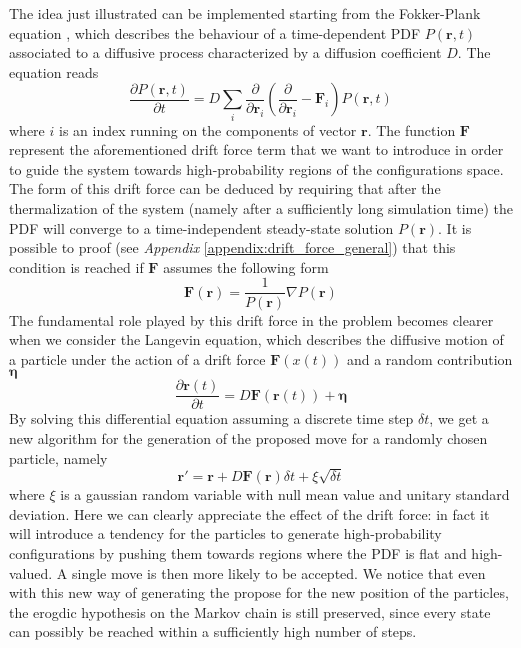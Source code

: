 The idea just illustrated can be implemented starting from the Fokker-Plank equation \cite{lectures2015}, which describes the behaviour of a time-dependent PDF $P(\bm{r}, t)$ associated to a diffusive process characterized by a diffusion coefficient $D$. The equation reads
\begin{equation*}
    \frac{\partial P(\bm{r}, t)}{\partial t} = D \sum_i \frac{\partial}{\partial \bm{r}_i} \left( \frac{\partial}{\partial \bm{r}_i} - \bm{F}_i \right) P(\bm{r}, t)
\end{equation*}
where $i$ is an index running on the components of vector $\bm{r}$. The function $\bm{F}$ represent the aforementioned drift force term that we want to introduce in order to guide the system towards high-probability regions of the configurations space. The form of this drift force can be deduced by requiring that after the thermalization of the system (namely after a sufficiently long simulation time) the PDF will converge to a time-independent steady-state solution $P(\bm{r})$. It is possible to proof (see \textit{Appendix} \ref{appendix:drift_force_general}) that this condition is reached if $\bm{F}$ assumes the following form
\begin{equation*}
    \bm{F}(\bm{r}) = \frac{1}{P(\bm{r})} \nabla P(\bm{r})
\end{equation*}
The fundamental role played by this drift force in the problem becomes clearer when we consider the Langevin equation, which describes the diffusive motion of a particle under the action of a drift force $\bm{F}(x(t))$ and a random contribution $\bm{\eta}$ 
\begin{equation*}
    \frac{\partial \bm{r}(t)}{\partial t} = D \bm{F}(\bm{r}(t)) + \bm{\eta}  
\end{equation*}
By solving this differential equation assuming a discrete time step $\delta t$, we get a new algorithm for the generation of the proposed move for a randomly chosen particle, namely
\begin{equation*}
    \bm{r}' = \bm{r} + D \bm{F}(\bm{r}) \delta t + \xi \sqrt{\delta t}
\end{equation*}
where $\xi$ is a gaussian random variable with null mean value and unitary standard deviation. Here we can clearly appreciate the effect of the drift force: in fact it will introduce a tendency for the particles to generate high-probability configurations by pushing them towards regions where the PDF is flat and high-valued. A single move is then more likely to be accepted. We notice that even with this new way of generating the propose for the new position of the particles, the erogdic hypothesis on the Markov chain is still preserved, since every state can possibly be reached within a sufficiently high number of steps. 

